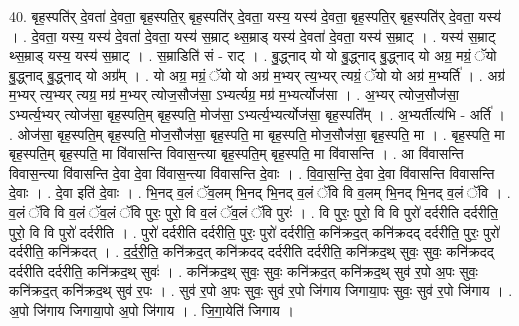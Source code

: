 \documentclass[17pt]{extarticle}
\begin{document}
40. बृह॒स्पति॑र् दे॒वता॑ दे॒वता॒ बृह॒स्पति॒र् बृह॒स्पति॑र् दे॒वता॒ यस्य॒ यस्य॑ दे॒वता॒ बृह॒स्पति॒र् बृह॒स्पति॑र् दे॒वता॒ यस्य॑ । . दे॒वता॒ यस्य॒ यस्य॑ दे॒वता॑ दे॒वता॒ यस्य॑ स॒म्राट् थ्स॒म्राड् यस्य॑ दे॒वता॑ दे॒वता॒ यस्य॑ स॒म्राट् । . यस्य॑ स॒म्राट् थ्स॒म्राड् यस्य॒ यस्य॑ स॒म्राट् । . स॒म्राडिति॑ सं - राट् । . बु॒द्ध्नाद् यो यो बु॒द्ध्नाद् बु॒द्ध्नाद् यो अग्र॒ मग्रं॒ ॅयो बु॒द्ध्नाद् बु॒द्ध्नाद् यो अग्र᳚म् । . यो अग्र॒ मग्रं॒ ॅयो यो अग्र॑ म॒भ्यर् त्य॒भ्यर् त्यग्रं॒ ॅयो यो अग्र॑ म॒भ्यर्ति॑ । . अग्र॑ म॒भ्यर् त्य॒भ्यर् त्यग्र॒ मग्र॑ म॒भ्यर् त्योज॒सौज॑सा॒ ऽभ्यर्त्यग्र॒ मग्र॑ म॒भ्यर्त्योज॑सा । . अ॒भ्यर् त्योज॒सौज॑सा॒ ऽभ्यर्त्य॒भ्यर् त्योज॑सा॒ बृह॒स्पति॒म् बृह॒स्पति॒ मोज॑सा॒ ऽभ्यर्त्य॒भ्यर्त्योज॑सा॒ बृह॒स्पति᳚म् । . अ॒भ्यर्तीत्य॑भि - अर्ति॑ । . ओज॑सा॒ बृह॒स्पति॒म् बृह॒स्पति॒ मोज॒सौज॑सा॒ बृह॒स्पति॒ मा बृह॒स्पति॒ मोज॒सौज॑सा॒ बृह॒स्पति॒ मा । . बृह॒स्पति॒ मा बृह॒स्पति॒म् बृह॒स्पति॒ मा वि॑वासन्ति विवास॒न्त्या बृह॒स्पति॒म् बृह॒स्पति॒ मा वि॑वासन्ति । . आ वि॑वासन्ति विवास॒न्त्या वि॑वासन्ति दे॒वा दे॒वा वि॑वास॒न्त्या वि॑वासन्ति दे॒वाः । . वि॒वा॒स॒न्ति॒ दे॒वा दे॒वा वि॑वासन्ति विवासन्ति दे॒वाः । . दे॒वा इति॑ दे॒वाः । . भि॒नद् व॒लं ॅव॒लम् भि॒नद् भि॒नद् व॒लं ॅवि वि व॒लम् भि॒नद् भि॒नद् व॒लं ॅवि । . व॒लं ॅवि वि व॒लं ॅव॒लं ॅवि पुरः॒ पुरो॒ वि व॒लं ॅव॒लं ॅवि पुरः॑ । . वि पुरः॒ पुरो॒ वि वि पुरो॑ दर्दरीति दर्दरीति॒ पुरो॒ वि वि पुरो॑ दर्दरीति । . पुरो॑ दर्दरीति दर्दरीति॒ पुरः॒ पुरो॑ दर्दरीति॒ कनि॑क्रद॒त् कनि॑क्रदद् दर्दरीति॒ पुरः॒ पुरो॑ दर्दरीति॒ कनि॑क्रदत् । . द॒र्द॒री॒ति॒ कनि॑क्रद॒त् कनि॑क्रदद् दर्दरीति दर्दरीति॒ कनि॑क्रद॒थ् सुवः॒ सुवः॒ कनि॑क्रदद् दर्दरीति दर्दरीति॒ कनि॑क्रद॒थ् सुवः॑ । . कनि॑क्रद॒थ् सुवः॒ सुवः॒ कनि॑क्रद॒त् कनि॑क्रद॒थ् सुव॑ र॒पो अ॒पः सुवः॒ कनि॑क्रद॒त् कनि॑क्रद॒थ् सुव॑ र॒पः । . सुव॑ र॒पो अ॒पः सुवः॒ सुव॑ र॒पो जि॑गाय जिगाया॒पः सुवः॒ सुव॑ र॒पो जि॑गाय । . अ॒पो जि॑गाय जिगाया॒पो अ॒पो जि॑गाय । . जि॒गा॒येति॑ जिगाय । \newline
\pagebreak
\end{document}
